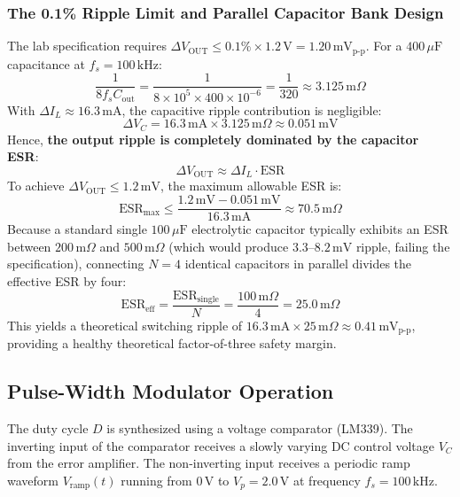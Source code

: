 \documentclass[12pt,a4paper]{article}
\newcommand{\Vout}{V_{\mathrm{OUT}}}
\newcommand{\Vc}{V_C}
\newcommand{\Vramp}{V_{\mathrm{ramp}}}
\newcommand{\dI}{\Delta I_L}
\newcommand{\fs}{f_s}
\newcommand{\ESR}{\mathrm{ESR}}
\begin{document}
\subsubsection{The 0.1\% Ripple Limit and Parallel Capacitor Bank Design}
The lab specification requires $\Delta \Vout \le 0.1\% \times 1.2\,\mathrm{V} = 1.20\,\mathrm{mV}_{\mathrm{p\text{-}p}}$.
For a $400\,\mu\mathrm{F}$ capacitance at $\fs = 100\,\mathrm{kHz}$:
\begin{equation}
    \frac{1}{8 \fs C_{\mathrm{out}}} = \frac{1}{8 \times 10^5 \times 400 \times 10^{-6}} = \frac{1}{320} \approx 3.125\,\mathrm{m}\Omega
\end{equation}
With $\dI \approx 16.3\,\mathrm{mA}$, the capacitive ripple contribution is negligible:
\begin{equation}
    \Delta V_C = 16.3\,\mathrm{mA} \times 3.125\,\mathrm{m}\Omega \approx 0.051\,\mathrm{mV}
\end{equation}
Hence, \textbf{the output ripple is completely dominated by the capacitor ESR}:
\begin{equation}
    \Delta \Vout \approx \dI \cdot \ESR
\end{equation}
To achieve $\Delta \Vout \le 1.2\,\mathrm{mV}$, the maximum allowable ESR is:
\begin{equation}
    \ESR_{\mathrm{max}} \le \frac{1.2\,\mathrm{mV} - 0.051\,\mathrm{mV}}{16.3\,\mathrm{mA}} \approx 70.5\,\mathrm{m}\Omega
\end{equation}
Because a standard single $100\,\mu\mathrm{F}$ electrolytic capacitor typically exhibits an ESR between $200\,\mathrm{m}\Omega$ and $500\,\mathrm{m}\Omega$ (which would produce $3.3\text{--}8.2\,\mathrm{mV}$ ripple, failing the specification), connecting $N = 4$ identical capacitors in parallel divides the effective ESR by four:
\begin{equation}
    \ESR_{\mathrm{eff}} = \frac{\ESR_{\mathrm{single}}}{N} = \frac{100\,\mathrm{m}\Omega}{4} = 25.0\,\mathrm{m}\Omega
\end{equation}
This yields a theoretical switching ripple of $16.3\,\mathrm{mA} \times 25\,\mathrm{m}\Omega \approx 0.41\,\mathrm{mV}_{\mathrm{p\text{-}p}}$, providing a healthy theoretical factor-of-three safety margin.

\subsection{Pulse-Width Modulator Operation}
The duty cycle $D$ is synthesized using a voltage comparator (LM339). The inverting input of the comparator receives a slowly varying DC control voltage $\Vc$ from the error amplifier. The non-inverting input receives a periodic ramp waveform $\Vramp(t)$ running from $0\,\mathrm{V}$ to $V_{p} = 2.0\,\mathrm{V}$ at frequency $\fs = 100\,\mathrm{kHz}$.
\end{document}
